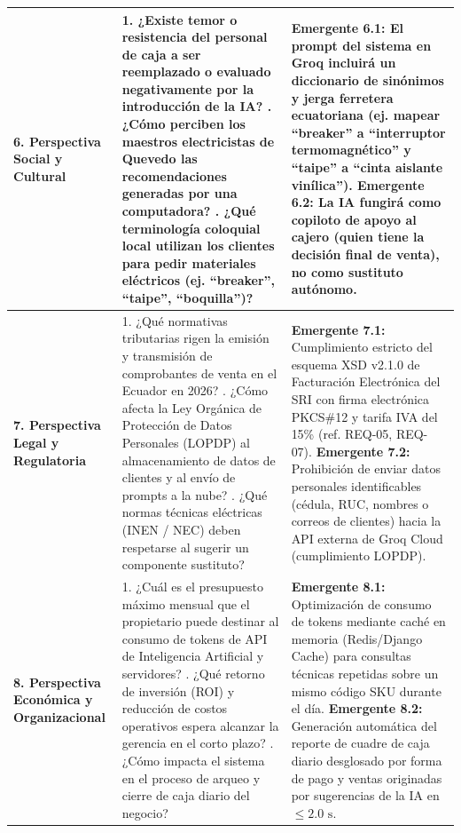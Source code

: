 \begin{table}[htbp]
\begin{tabularx}{\textwidth}{l Y Y}
\textbf{6. Perspectiva Social y Cultural} & 
1. ¿Existe temor o resistencia del personal de caja a ser reemplazado o evaluado negativamente por la introducción de la IA? . ¿Cómo perciben los maestros electricistas de Quevedo las recomendaciones generadas por una computadora? . ¿Qué terminología coloquial local utilizan los clientes para pedir materiales eléctricos (ej. ``breaker'', ``taipe'', ``boquilla'')? & 
\textbf{Emergente 6.1:} El prompt del sistema en Groq incluirá un diccionario de sinónimos y jerga ferretera ecuatoriana (ej. mapear ``breaker'' a ``interruptor termomagnético'' y ``taipe'' a ``cinta aislante vinílica''). \newline
\textbf{Emergente 6.2:} La IA fungirá como copiloto de apoyo al cajero (quien tiene la decisión final de venta), no como sustituto autónomo. \\
\midrule
\textbf{7. Perspectiva Legal y Regulatoria} & 
1. ¿Qué normativas tributarias rigen la emisión y transmisión de comprobantes de venta en el Ecuador en 2026? . ¿Cómo afecta la Ley Orgánica de Protección de Datos Personales (LOPDP) al almacenamiento de datos de clientes y al envío de prompts a la nube? . ¿Qué normas técnicas eléctricas (INEN / NEC) deben respetarse al sugerir un componente sustituto? & 
\textbf{Emergente 7.1:} Cumplimiento estricto del esquema XSD v2.1.0 de Facturación Electrónica del SRI con firma electrónica PKCS\#12 y tarifa IVA del 15\% (ref. REQ-05, REQ-07). \newline
\textbf{Emergente 7.2:} Prohibición de enviar datos personales identificables (cédula, RUC, nombres o correos de clientes) hacia la API externa de Groq Cloud (cumplimiento LOPDP). \\
\midrule
\textbf{8. Perspectiva Económica y Organizacional} & 
1. ¿Cuál es el presupuesto máximo mensual que el propietario puede destinar al consumo de tokens de API de Inteligencia Artificial y servidores? . ¿Qué retorno de inversión (ROI) y reducción de costos operativos espera alcanzar la gerencia en el corto plazo? . ¿Cómo impacta el sistema en el proceso de arqueo y cierre de caja diario del negocio? & 
\textbf{Emergente 8.1:} Optimización de consumo de tokens mediante caché en memoria (Redis/Django Cache) para consultas técnicas repetidas sobre un mismo código SKU durante el día. \newline
\textbf{Emergente 8.2:} Generación automática del reporte de cuadre de caja diario desglosado por forma de pago y ventas originadas por sugerencias de la IA en $\le 2.0\text{ s}$. \\
\bottomrule
\end{tabularx}
\end{table}

